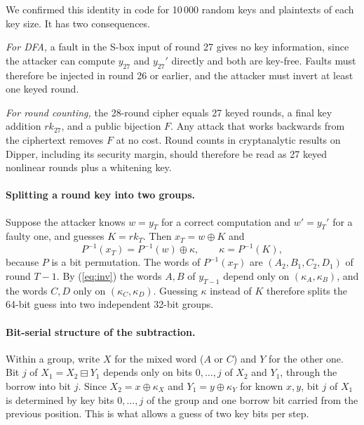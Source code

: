 \documentclass[pdflatex,sn-mathphys-num]{sn-jnl}
\theoremstyle{thmstyleone}%
\theoremstyle{thmstylethree}%
\newcommand{\rk}{\mathit{rk}}
\begin{document}
We confirmed this identity in code for 10\,000 random keys and plaintexts of each key size. It has two
consequences.

\emph{For DFA,} a fault in the S-box input of round 27 gives no key information, since the attacker can
compute $y_{27}$ and $y_{27}'$ directly and both are key-free. Faults must therefore be injected in
round 26 or earlier, and the attacker must invert at least one keyed round.

\emph{For round counting,} the 28-round cipher equals 27 keyed rounds, a final key addition $\rk_{27}$,
and a public bijection $F$. Any attack that works backwards from the ciphertext removes $F$ at no cost.
Round counts in cryptanalytic results on Dipper, including its security margin, should therefore be
read as 27 keyed nonlinear rounds plus a whitening key.

\paragraph{Splitting a round key into two groups.} Suppose the attacker knows
$w = y_T$ for a correct computation and $w' = y_T'$ for a faulty one, and guesses $K = \rk_T$. Then
$x_T = w\oplus K$ and
\begin{equation}\label{eq:kappa}
P^{-1}(x_T) = P^{-1}(w)\oplus \kappa, \qquad \kappa = P^{-1}(K),
\end{equation}
because $P$ is a bit permutation. The words of $P^{-1}(x_T)$ are $(A_2,B_1,C_2,D_1)$ of round $T-1$.
By (\ref{eq:inv}) the words $A,B$ of $y_{T-1}$ depend only on $(\kappa_A,\kappa_B)$, and the words $C,D$
only on $(\kappa_C,\kappa_D)$. Guessing $\kappa$ instead of $K$ therefore splits the 64-bit guess into
two independent 32-bit groups.

\paragraph{Bit-serial structure of the subtraction.} Within a group, write $X$ for the mixed word
($A$ or $C$) and $Y$ for the other one. Bit $j$ of $X_1 = X_2\boxminus Y_1$ depends only on bits
$0,\dots,j$ of $X_2$ and $Y_1$, through the borrow into bit $j$. Since $X_2 = x\oplus\kappa_X$ and
$Y_1 = y\oplus\kappa_Y$ for known $x,y$, bit $j$ of $X_1$ is determined by key bits $0,\dots,j$ of the
group and one borrow bit carried from the previous position. This is what allows a guess of two key
bits per step.
\end{document}
